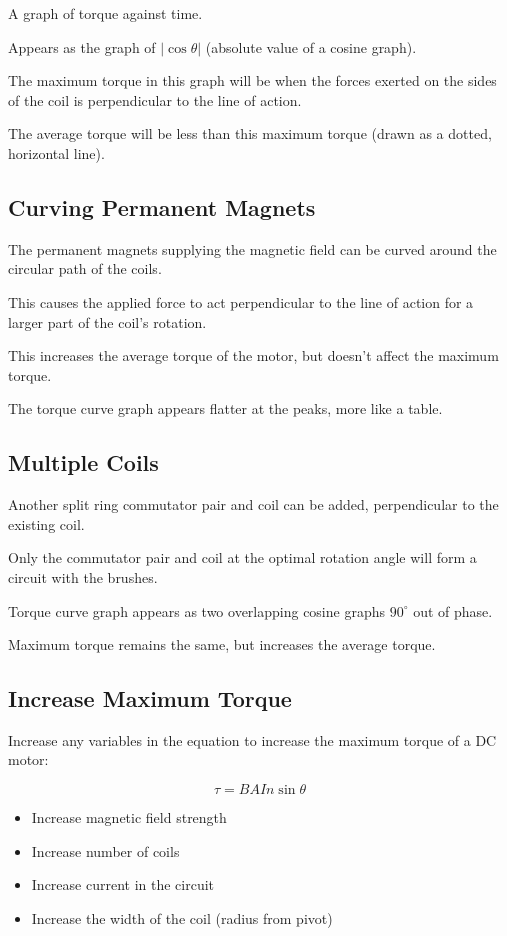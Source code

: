 \documentclass[a4paper,11pt]{article}
\begin{document}
A graph of torque against time.

Appears as the graph of $\lvert \cos{\theta} \rvert$ (absolute value of a
cosine graph).

The maximum torque in this graph will be when the forces exerted on the sides
of the coil is perpendicular to the line of action.

The average torque will be less than this maximum torque (drawn as a dotted,
horizontal line).


\subsection{Curving Permanent Magnets}

The permanent magnets supplying the magnetic field can be curved around the
circular path of the coils.

This causes the applied force to act perpendicular to the line of action for
a larger part of the coil's rotation.

This increases the average torque of the motor, but doesn't affect the maximum
torque.

The torque curve graph appears flatter at the peaks, more like a table.


\subsection{Multiple Coils}

Another split ring commutator pair and coil can be added, perpendicular to the
existing coil.

Only the commutator pair and coil at the optimal rotation angle will form a
circuit with the brushes.

Torque curve graph appears as two overlapping cosine graphs $90^\circ$ out of
phase.

Maximum torque remains the same, but increases the average torque.


\subsection{Increase Maximum Torque}

Increase any variables in the equation to increase the maximum torque of a DC
motor:

$$
\tau = B A I n \sin{\theta}
$$

\begin{itemize}
\item Increase magnetic field strength
\item Increase number of coils
\item Increase current in the circuit
\item Increase the width of the coil (radius from pivot)
\end{itemize}
\end{document}
